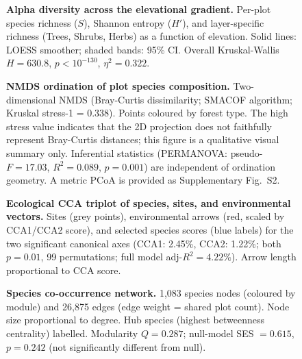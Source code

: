 \documentclass[review,12pt,a4paper]{elsarticle}
\begin{document}
\begin{figure}[htbp]
  \centering
  \caption{\textbf{Alpha diversity across the elevational gradient.}
    Per-plot species richness ($S$), Shannon entropy ($H'$), and
    layer-specific richness (Trees, Shrubs, Herbs) as a function of
    elevation. Solid lines: LOESS smoother; shaded bands: 95\% CI.
    Overall Kruskal-Wallis $H = 630.8$, $p < 10^{-130}$, $\eta^2 = 0.322$.}
  \label{fig:alpha}
\end{figure}

\begin{figure}[htbp]
  \centering
  \caption{\textbf{NMDS ordination of plot species composition.}
    Two-dimensional NMDS (Bray-Curtis dissimilarity; SMACOF algorithm;
    Kruskal stress-1 = 0.338). Points coloured by forest type. The high
    stress value indicates that the 2D projection does not faithfully
    represent Bray-Curtis distances; this figure is a qualitative visual
    summary only. Inferential statistics (PERMANOVA:
    pseudo-$F = 17.03$, $R^2 = 0.089$, $p = 0.001$) are independent of
    ordination geometry. A metric PCoA is provided as Supplementary
    Fig.~S2.}
  \label{fig:nmds}
\end{figure}

\begin{figure}[htbp]
  \centering
  \caption{\textbf{Ecological CCA triplot of species, sites, and
    environmental vectors.}
    Sites (grey points), environmental arrows (red, scaled by CCA1/CCA2
    score), and selected species scores (blue labels) for the two
    significant canonical axes (CCA1: 2.45\%, CCA2: 1.22\%;
    both $p = 0.01$, 99 permutations; full model adj-$R^2 = 4.22\%$).
    Arrow length proportional to CCA score.}
  \label{fig:cca}
\end{figure}

\begin{figure}[htbp]
  \centering
  \caption{\textbf{Species co-occurrence network.}
    1{,}083 species nodes (coloured by module) and 26{,}875 edges
    (edge weight = shared plot count). Node size proportional to degree.
    Hub species (highest betweenness centrality) labelled.
    Modularity $Q = 0.287$; null-model SES $= 0.615$, $p = 0.242$
    (not significantly different from null).}
  \label{fig:network}
\end{figure}
\end{document}
